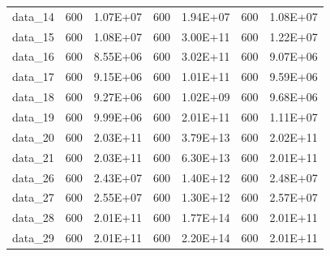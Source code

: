 \begin{table}[]
\begin{tabular}{lllllll}
data\_14 & 600               & 1.07E+07             & 600            & 1.94E+07          & 600                & 1.08E+07              \\
data\_15 & 600               & 1.08E+07             & 600            & 3.00E+11          & 600                & 1.22E+07              \\
data\_16 & 600               & 8.55E+06             & 600            & 3.02E+11          & 600                & 9.07E+06              \\
data\_17 & 600               & 9.15E+06             & 600            & 1.01E+11          & 600                & 9.59E+06              \\
data\_18 & 600               & 9.27E+06             & 600            & 1.02E+09          & 600                & 9.68E+06              \\
data\_19 & 600               & 9.99E+06             & 600            & 2.01E+11          & 600                & 1.11E+07              \\
data\_20 & 600               & 2.03E+11             & 600            & 3.79E+13          & 600                & 2.02E+11              \\
data\_21 & 600               & 2.03E+11             & 600            & 6.30E+13          & 600                & 2.01E+11              \\
data\_26 & 600               & 2.43E+07             & 600            & 1.40E+12          & 600                & 2.48E+07              \\
data\_27 & 600               & 2.55E+07             & 600            & 1.30E+12          & 600                & 2.57E+07              \\
data\_28 & 600               & 2.01E+11             & 600            & 1.77E+14          & 600                & 2.01E+11              \\
data\_29 & 600               & 2.01E+11             & 600            & 2.20E+14          & 600                & 2.01E+11              \\ \hline
\end{tabular}
\end{table}